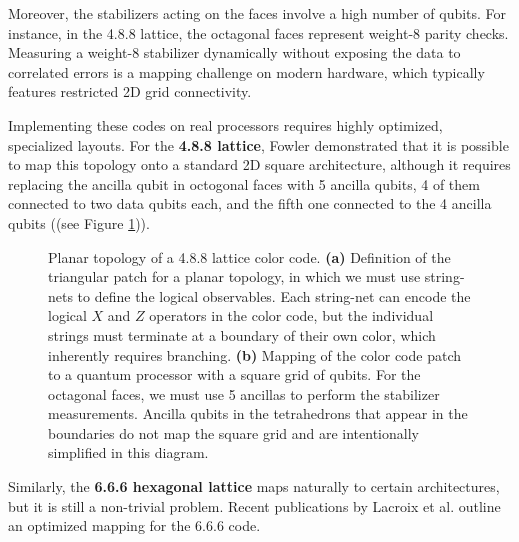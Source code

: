 Moreover, the stabilizers acting on the faces involve a high number of qubits. For instance, in the 4.8.8 lattice, the octagonal faces represent weight-8 parity checks. Measuring a weight-8 stabilizer dynamically without exposing the data to correlated errors is a mapping challenge on modern hardware, which typically features restricted 2D grid connectivity.

Implementing these codes on real processors requires highly optimized, specialized layouts. For the \textbf{4.8.8 lattice}, Fowler \cite{Fowler_2011} demonstrated that it is possible to map this topology onto a standard 2D square architecture, although it requires replacing the ancilla qubit in octogonal faces with 5 ancilla qubits, 4 of them connected to two data qubits each, and the fifth one connected to the 4 ancilla qubits ((see Figure \ref{fig:2:planar_color_code})).


\begin{figure}[htbp]
    \centering
    \begin{subfigure}[b]{0.47\textwidth}
        \centering
        
        \caption{}
    \end{subfigure}
    \hfill
    \begin{subfigure}[b]{0.47\textwidth}
        \centering
        
        \caption{}
    \end{subfigure}
    \caption[Planar topology of a 4.8.8 lattice color code.]{Planar topology of a 4.8.8 lattice color code. \textbf{(a)} Definition of the triangular patch for a planar topology, in which we must use string-nets to define the logical observables. Each string-net can encode the logical $X$ and $Z$ operators in the color code, but the individual strings must terminate at a boundary of their own color, which inherently requires branching. \textbf{(b)} Mapping of the color code patch to a quantum processor with a square grid of qubits. For the octagonal faces, we must use 5 ancillas to perform the stabilizer measurements. Ancilla qubits in the tetrahedrons that appear in the boundaries do not map the square grid and are intentionally simplified in this diagram.}
    \label{fig:2:planar_color_code}
\end{figure}


Similarly, the \textbf{6.6.6 hexagonal lattice} maps naturally to certain architectures, but it is still a non-trivial problem. Recent publications by Lacroix et al. \cite{Lacroix_2025} outline an optimized mapping for the 6.6.6 code.

